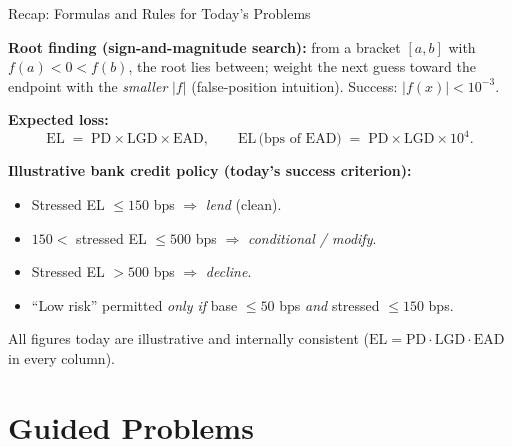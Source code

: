 \documentclass[9pt,t]{beamer}
\begin{document}
\begin{frame}{Recap: Formulas and Rules for Today's Problems}

\textbf{Root finding (sign-and-magnitude search):} from a bracket $[a,b]$ with
$f(a)<0<f(b)$, the root lies between; weight the next guess toward the endpoint
with the \emph{smaller} $|f|$ (false-position intuition). Success: $|f(x)|<10^{-3}$.

\medskip
\textbf{Expected loss:}
\[
  \mathrm{EL} \;=\; \mathrm{PD}\times\mathrm{LGD}\times\mathrm{EAD},
  \qquad
  \mathrm{EL}\,\text{(bps of EAD)} \;=\; \mathrm{PD}\times\mathrm{LGD}\times 10^4 .
\]

\medskip
\textbf{Illustrative bank credit policy (today's success criterion):}
\begin{itemize}
  \item Stressed EL $\leq 150$ bps $\Rightarrow$ \emph{lend} (clean).
  \item $150 <$ stressed EL $\leq 500$ bps $\Rightarrow$ \emph{conditional / modify}.
  \item Stressed EL $> 500$ bps $\Rightarrow$ \emph{decline}.
  \item ``Low risk'' permitted \emph{only if} base $\leq 50$ bps \emph{and}
        stressed $\leq 150$ bps.
\end{itemize}

\medskip
\footnotesize All figures today are illustrative and internally consistent
($\mathrm{EL}=\mathrm{PD}\cdot\mathrm{LGD}\cdot\mathrm{EAD}$ in every column).
\end{frame}

\section{Guided Problems}
\end{document}
